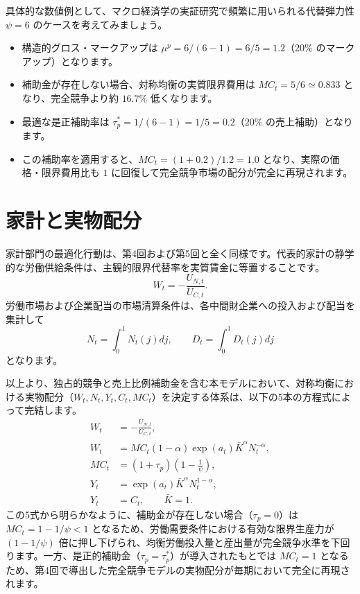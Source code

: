 \documentclass[
  japanese,
  lualatex,
  ja=standard,
  12pt,
  a4paper]{ltjsarticle}
\providecommand{\tightlist}{%
  \setlength{\itemsep}{0pt}\setlength{\parskip}{0pt}}
\begin{document}
\begin{tcolorbox}[enhanced jigsaw, arc=.35mm, bottomrule=.15mm, bottomtitle=1mm, breakable, colback=white, colbacktitle=quarto-callout-tip-color!10!white, colframe=quarto-callout-tip-color-frame, coltitle=black, left=2mm, leftrule=.75mm, opacityback=0, opacitybacktitle=0.6, rightrule=.15mm, title=\textcolor{quarto-callout-tip-color}{\faLightbulb}\hspace{0.5em}{数値例：\(\psi=6\)}, titlerule=0mm, toprule=.15mm, toptitle=1mm]

具体的な数値例として、マクロ経済学の実証研究で頻繁に用いられる代替弾力性
\(\psi = 6\) のケースを考えてみましょう。

\begin{itemize}
\tightlist
\item
  構造的グロス・マークアップは \(\mu^p = 6/(6-1) = 6/5 = 1.2\)（\(20\%\)
  のマークアップ）となります。
\item
  補助金が存在しない場合、対称均衡の実質限界費用は
  \(MC_t = 5/6 \simeq 0.833\) となり、完全競争より約 \(16.7\%\)
  低くなります。
\item
  最適な是正補助率は \(\tau_p^* = 1/(6-1) = 1/5 = 0.2\)（\(20\%\)
  の売上補助）となります。
\item
  この補助率を適用すると、\(MC_t = (1+0.2)/1.2 = 1.0\)
  となり、実際の価格・限界費用比も \(1\)
  に回復して完全競争市場の配分が完全に再現されます。
\end{itemize}

\end{tcolorbox}

\section{家計と実物配分}\label{ux5bb6ux8a08ux3068ux5b9fux7269ux914dux5206}

家計部門の最適化行動は、第4回および第5回と全く同様です。代表的家計の静学的な労働供給条件は、主観的限界代替率を実質賃金に等置することです。
\[
W_t = -\frac{U_{N,t}}{U_{C,t}}.
\]
労働市場および企業配当の市場清算条件は、各中間財企業への投入および配当を集計して
\[
N_t = \int_0^1 N_t(j) dj, \qquad D_t = \int_0^1 D_t(j) dj
\] となります。

以上より、独占的競争と売上比例補助金を含む本モデルにおいて、対称均衡における実物配分（\(W_t, N_t, Y_t, C_t, MC_t\)）を決定する体系は、以下の5本の方程式によって完結します。
\[
\begin{aligned}
W_t &= -\frac{U_{N,t}}{U_{C,t}},\\
W_t &= MC_t (1-\alpha) \exp(a_t) \bar{K}^\alpha N_t^{-\alpha},\\
MC_t &= (1+\tau_p) \left( 1 - \frac{1}{\psi} \right),\\
Y_t &= \exp(a_t) \bar{K}^\alpha N_t^{1-\alpha},\\
Y_t &= C_t, \qquad \bar{K}=1.
\end{aligned}
\] この5式から明らかなように、補助金が存在しない場合（\(\tau_p = 0\)）は
\(MC_t = 1 - 1/\psi < 1\)
となるため、労働需要条件における有効な限界生産力が \((1-1/\psi)\)
倍に押し下げられ、均衡労働投入量と産出量が完全競争水準を下回ります。一方、是正的補助金（\(\tau_p = \tau_p^*\)）が導入されたもとでは
\(MC_t = 1\)
となるため、第4回で導出した完全競争モデルの実物配分が毎期において完全に再現されます。
\end{document}
